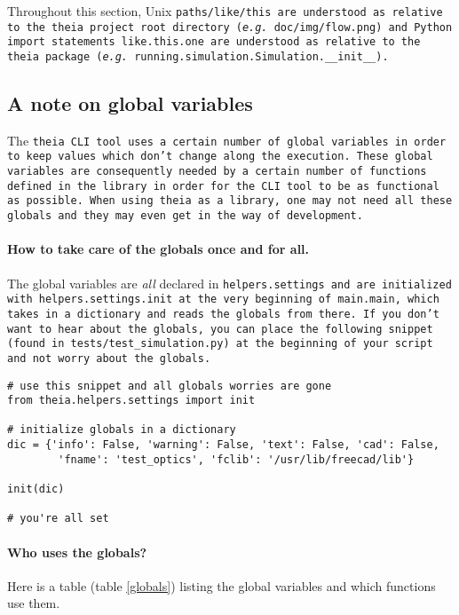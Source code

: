 \documentclass{article}
\begin{document}
Throughout this section, Unix \tt{paths/like/this} are understood as relative to the theia project root directory (\textit{e.g.} \tt{doc/img/flow.png}) and Python import statements \tt{like.this.one} are understood as relative to the theia package (\textit{e.g.} \tt{running.simulation.Simulation.\_\_init\_\_}).


\subsection{A note on global variables}
The \tt{theia} CLI tool uses a certain number of global variables in order to keep values which don't change along the execution. These global variables are consequently needed by a certain number of functions defined in the library in order for the CLI tool to be as functional as possible. When using \tt{theia} as a library, one may not need all these globals and they may even get in the way of development.

\paragraph{How to take care of the globals once and for all.}The global variables are \textit{all} declared in \tt{helpers.settings} and are initialized with \tt{helpers.settings.init} at the very beginning of \tt{main.main}, which takes in a dictionary and reads the globals from there. If you don't want to hear about the globals, you can place the following snippet (found in \tt{tests/test\_simulation.py}) at the beginning of your script and not worry about the globals.

\begin{lstlisting}
# use this snippet and all globals worries are gone
from theia.helpers.settings import init

# initialize globals in a dictionary
dic = {'info': False, 'warning': False, 'text': False, 'cad': False,
		'fname': 'test_optics', 'fclib': '/usr/lib/freecad/lib'}

init(dic)

# you're all set
\end{lstlisting}

\paragraph{Who uses the globals?}Here is a table (table \ref{globals}) listing the global variables and which functions use them.
\end{document}
